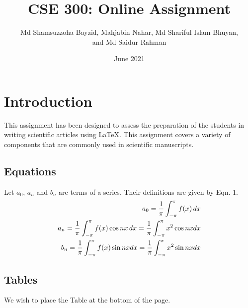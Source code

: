 \documentclass[16pt]{article}
\title{CSE 300: Online Assignment}
\author{Md Shamsuzzoha Bayzid, Mahjabin Nahar, Md Shariful Islam Bhuyan,\\ 
    and Md Saidur Rahman}
\date{June 2021}
\begin{document}
    \maketitle
    \section{Introduction}
    This assignment has been designed to assess the preparation of the students in writing scientific articles using \LaTeX. This assignment covers a variety of components that are commonly used in scientific manuscripts.
    \subsection{Equations}
    Let $a_0$, $a_n$ and $b_n$ are terms of a series. Their definitions are given by Eqn. 1.\\
    \vspace{2em}
    \begin{align}
        a_0=\frac{1}{\pi}\int_{-\pi}^{\pi}f(x)\,dx\notag\\
        a_n=\frac{1}{\pi}\int_{-\pi}^{\pi}f(x)\cos{nx}\,dx=\frac{1}{\pi}\int_{-\pi}^{\pi}x^2\cos{nx}dx\notag\\
        b_n=\frac{1}{\pi}\int_{-\pi}^{\pi}f(x)\sin{nx}dx=\frac{1}{\pi}\int_{-\pi}^{\pi}x^2\sin{nx}dx\notag\\
    \end{align}
    \subsection{Tables}
        We wish to place the Table at the bottom of the page.
\end{document}
